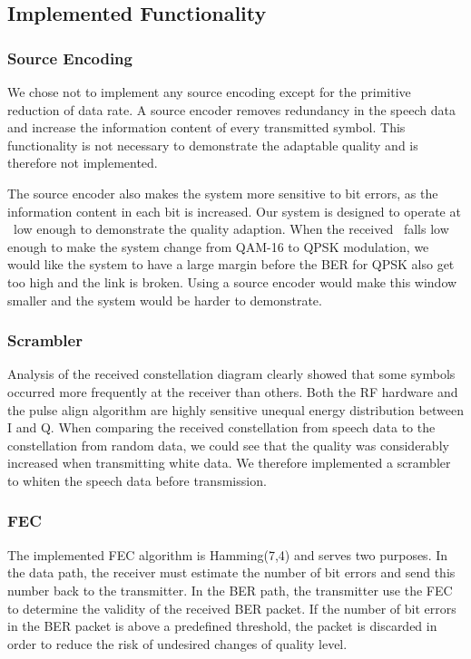 \subsection{Implemented Functionality}
\subsubsection{Source Encoding}
We chose not to implement any source encoding except for the primitive reduction of data rate. A source encoder removes redundancy in the speech data and increase the information content of every transmitted symbol. This functionality is not necessary to demonstrate the adaptable quality and is therefore not implemented. 

The source encoder also makes the system more sensitive to bit errors, as the information content in each bit is increased. Our system is designed to operate at \ebnot\ low enough to demonstrate the quality adaption. When the received \ebnot\ falls low enough to make the system change from QAM-16 to QPSK modulation, we would like the system to have a large margin before the BER for QPSK also get too high and the link is broken. Using a source encoder would make this window smaller and the system would be harder to demonstrate. 

\subsubsection{Scrambler}
Analysis of the received constellation diagram clearly showed that some symbols occurred more frequently at the receiver than others. Both the RF hardware and the pulse align algorithm are highly sensitive unequal energy distribution between I and Q. When comparing the received constellation from speech data to the constellation from random data, we could see that the quality was considerably increased when transmitting white data. We therefore implemented a scrambler to whiten the speech data before transmission. 

\subsubsection{FEC}
The implemented FEC algorithm is Hamming(7,4) and serves two purposes. In the data path, the receiver must estimate the number of bit errors and send this number back to the transmitter. In the BER path, the transmitter use the FEC to determine the validity of the received BER packet. If the number of bit errors in the BER packet is above a predefined threshold, the packet is discarded in order to reduce the risk of undesired changes of quality level. 

